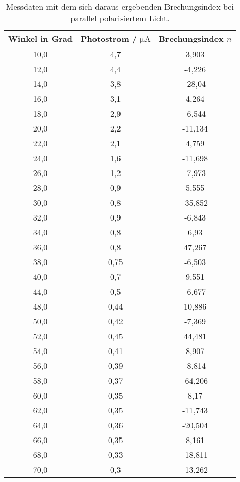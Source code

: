 \begin{table}[H]
    \centering
    \caption{Messdaten mit dem sich daraus ergebenden Brechungsindex bei parallel polarisiertem Licht.}
    \label{tab:ppolMess}
    \begin{tabular}{c c c}
        \toprule
        Winkel in Grad & Photostrom / $\si{\micro\ampere}$  & Brechungsindex $n$ \\
        \midrule
        10,0  &  4,7  &  3,903  \\
        12,0  &  4,4  &  -4,226  \\
        14,0  &  3,8  &  -28,04  \\
        16,0  &  3,1  &  4,264  \\
        18,0  &  2,9  &  -6,544  \\
        20,0  &  2,2  &  -11,134  \\
        22,0  &  2,1  &  4,759  \\
        24,0  &  1,6  &  -11,698  \\
        26,0  &  1,2  &  -7,973  \\
        28,0  &  0,9  &  5,555  \\
        30,0  &  0,8  &  -35,852  \\
        32,0  &  0,9  &  -6,843  \\
        34,0  &  0,8  &  6,93  \\
        36,0  &  0,8  &  47,267  \\
        38,0  &  0,75  &  -6,503  \\
        40,0  &  0,7  &  9,551  \\
        44,0  &  0,5  &  -6,677  \\
        48,0  &  0,44  &  10,886  \\
        50,0  &  0,42  &  -7,369  \\
        52,0  &  0,45  &  44,481  \\
        54,0  &  0,41  &  8,907  \\
        56,0  &  0,39  &  -8,814  \\
        58,0  &  0,37  &  -64,206  \\
        60,0  &  0,35  &  8,17  \\
        62,0  &  0,35  &  -11,743  \\
        64,0  &  0,36  &  -20,504  \\
        66,0  &  0,35  &  8,161  \\
        68,0  &  0,33  &  -18,811  \\
        70,0  &  0,3  &  -13,262  \\

\end{tabular}
\end{table}
